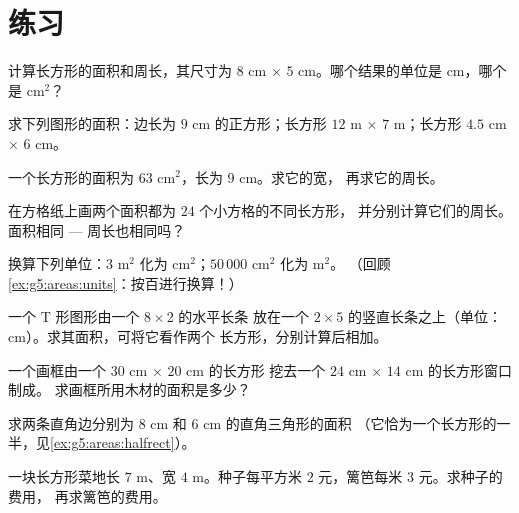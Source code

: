\section{练习}

\begin{exercise}[$\star$]\label{exo:g5:areas:1}
计算长方形的面积和周长，其尺寸为 $8$ cm $\times$
$5$ cm。哪个结果的单位是 cm，哪个是 cm$^2$？
\end{exercise}

\begin{exercise}[$\star$]\label{exo:g5:areas:2}
求下列图形的面积：边长为 $9$ cm 的正方形；长方形
$12$ m $\times$ $7$ m；长方形 $4.5$ cm $\times$ $6$ cm。
\end{exercise}

\begin{exercise}[$\star$]\label{exo:g5:areas:3}
一个长方形的面积为 $63$ cm$^2$，长为 $9$ cm。求它的宽，
再求它的周长。
\end{exercise}

\begin{exercise}[$\star$]\label{exo:g5:areas:4}
在方格纸上画两个面积都为 $24$ 个小方格的不同长方形，
并分别计算它们的周长。面积相同 --- 周长也相同吗？
\end{exercise}

\begin{exercise}[$\star$]\label{exo:g5:areas:5}
换算下列单位：$3$ m$^2$ 化为 cm$^2$；\quad $50\,000$ cm$^2$ 化为 m$^2$。
（回顾 \cref{ex:g5:areas:units}：按百进行换算！）
\end{exercise}

\begin{exercise}[$\star$]\label{exo:g5:areas:6}
一个 T 形图形由一个 $8 \times 2$ 的水平长条
放在一个 $2 \times 5$ 的竖直长条之上（单位：cm）。求其面积，可将它看作两个
长方形，分别计算后相加。
\end{exercise}

\begin{exercise}[$\star$]\label{exo:g5:areas:7}
一个画框由一个 $30$ cm $\times$ $20$ cm 的长方形
挖去一个 $24$ cm $\times$ $14$ cm 的长方形窗口制成。
求画框所用木材的面积是多少？
\end{exercise}

\begin{exercise}[$\star$]\label{exo:g5:areas:8}
求两条直角边分别为 $8$ cm 和 $6$ cm 的直角三角形的面积
（它恰为一个长方形的一半，见\cref{ex:g5:areas:halfrect}）。
\end{exercise}

\begin{exercise}[$\star$]\label{exo:g5:areas:9}
一块长方形菜地长 $7$ m、宽 $4$ m。种子每平方米
$2$ 元，篱笆每米 $3$ 元。求种子的费用，
再求篱笆的费用。
\end{exercise}

